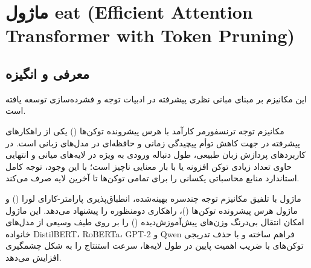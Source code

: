 \section{ماژول eat (Efficient Attention Transformer with Token Pruning)}
\label{sec:module_eat}

\subsection{معرفی و انگیزه}
این مکانیزم بر مبنای مبانی نظری پیشرفته در ادبیات توجه و فشرده‌سازی \cite{kim2022learned} توسعه یافته است.

مکانیزم توجه ترنسفورمر کارآمد با هرس پیشرونده توکن‌ها () یکی از راهکارهای پیشرفته در جهت کاهش توأم پیچیدگی زمانی و حافظه‌ای در مدل‌های زبانی است. در کاربردهای پردازش زبان طبیعی، طول دنباله ورودی به ویژه در لایه‌های میانی و انتهایی حاوی تعداد زیادی توکن افزونه یا با بار معنایی ناچیز است؛ با این وجود، توجه کامل استاندارد منابع محاسباتی یکسانی را برای تمامی توکن‌ها تا آخرین لایه صرف می‌کند.

ماژول  با تلفیق مکانیزم توجه چندسره بهینه‌شده، انطباق‌پذیری پارامتر-کارای لورا () و ماژول هرس پیشرونده توکن‌ها ()، راهکاری دومنظوره را پیشنهاد می‌دهد. این ماژول امکان انتقال بی‌درنگ وزن‌های پیش‌آموزش‌دیده () را بر روی طیف وسیعی از مدل‌های خانواده DistilBERT، RoBERTa، GPT-2 و Qwen فراهم ساخته و با حذف تدریجی توکن‌های با ضریب اهمیت پایین در طول لایه‌ها، سرعت استنتاج را به شکل چشمگیری افزایش می‌دهد.

